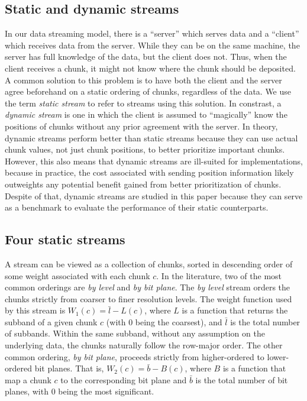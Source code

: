 \subsection{Static and dynamic streams}
\label{sec:static-dynamic-streams}

In our data streaming model, there is a ``server'' which serves data and a ``client'' which receives
data from the server. While they can be on the same machine, the server has full knowledge of the
data, but the client does not. Thus, when the client receives a chunk, it might not know where the
chunk should be deposited. A common solution to this problem is to have both the client and the
server agree beforehand on a static ordering of chunks, regardless of the data. We use the term
\emph{static stream} to refer to streams using this solution. In constrast, a \emph{dynamic stream}
is one in which the client is assumed to ``magically'' know the positions of chunks without any
prior agreement with the server. In theory, dynamic streams perform better than static streams
because they can use actual chunk values, not just chunk positions, to better prioritize important
chunks. However, this also means that dynamic streams are ill-suited for implementations, because in
practice, the cost associated with sending position information likely outweights any potential
benefit gained from better prioritization of chunks. Despite of that, dynamic streams are studied in
this paper because they can serve as a benchmark to evaluate the performance of their static
counterparts.

\subsection{Four static streams}
\label{sec:common-static-streams}

A stream can be viewed as a collection of chunks, sorted in descending order of some weight
associated with each chunk $c$. In the literature, two of the most common orderings are \emph{by
level} and \emph{by bit plane}. The \emph{by level} stream orders the chunks strictly from coarser
to finer resolution levels. The weight function used by this stream is $W_1(c)=\bar{l}-L(c)$, where
$L$ is a function that returns the subband of a given chunk $c$ (with $0$ being the coarsest), and
$\bar{l}$ is the total number of subbands. Within the same subband, without any assumption on the
underlying data, the chunks naturally follow the row-major order. The other common ordering,
\emph{by bit plane}, proceeds strictly from higher-ordered to lower-ordered bit planes. That is,
$W_2(c)=\bar{b}-B(c)$, where $B$ is a function that map a chunk $c$ to the corresponding bit plane
and $\bar{b}$ is the total number of bit planes, with $0$ being the most significant.

